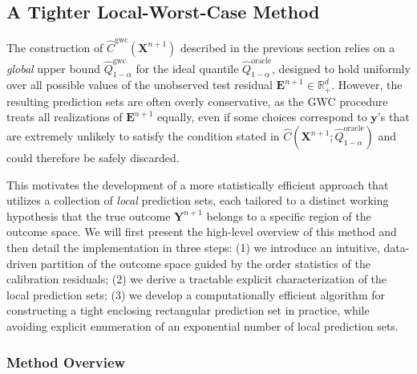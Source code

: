 \subsection{A Tighter Local-Worst-Case Method}
\label{sec:method-lwc}

The construction of $\hat{C}^{\mathrm{gwc}}(\mathbf{X}^{n+1})$ described in the previous section relies on a {\em global} upper bound $\hat{Q}^{\mathrm{gwc}}_{1-\alpha}$ for the ideal quantile $\hat{Q}^{\mathrm{oracle}}_{1-\alpha}$, designed to hold uniformly over all possible values of the unobserved test residual $\mathbf{E}^{n+1} \in \mathbb{R}^d_+$. However, the resulting prediction sets are often overly conservative, as the GWC procedure treats all realizations of $\mathbf{E}^{n+1}$ equally, even if some choices correspond to $\mathbf y$'s that are extremely unlikely to satisfy the condition stated in $\hat{C}(\mathbf{X}^{n+1}; \hat{Q}^{\mathrm{oracle}}_{1-\alpha})$ and could therefore be safely discarded.

This motivates the development of a more statistically efficient approach that utilizes a collection of {\em local} prediction sets, each tailored to a distinct working hypothesis that the true outcome $\mathbf{Y}^{n+1}$ belongs to a specific region of the outcome space. We will first present the high-level overview of this method and then detail the implementation in three steps: (1) we introduce an intuitive, data-driven partition of the outcome space guided by the order statistics of the calibration residuals; (2) we derive a tractable explicit characterization of the local prediction sets; (3) we develop a computationally efficient algorithm for constructing a tight enclosing rectangular prediction set in practice, while avoiding explicit enumeration of an exponential number of local prediction sets.

\subsubsection{Method Overview}

